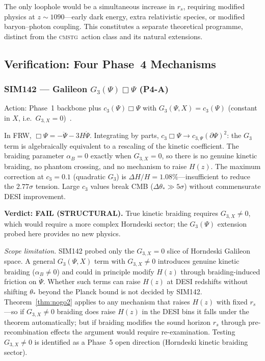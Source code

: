\documentclass[12pt,a4paper]{article}
\newcommand{\CMSTG}{\textsc{cmstg}}
\newcommand{\thetastar}{\theta_*}
\newcommand{\rs}{r_s}
\theoremstyle{plain}
\begin{document}
The only loophole would be a simultaneous increase in $\rs$, requiring
modified physics at $z\sim1090$---early dark energy, extra relativistic
species, or modified baryon--photon coupling. This constitutes a separate
theoretical programme, distinct from the \CMSTG\ action class and its
natural extensions.

\subsection{Verification: Four Phase~4 Mechanisms}
\label{sec:nogo2-sims}

\subsubsection{SIM142 --- Galileon $G_3(\Psi)\Box\Psi$ (P4-A)}

Action: Phase~1 backbone plus $c_3(\Psi)\Box\Psi$ with $G_3(\Psi,X)=c_3(\Psi)$
(constant in $X$, i.e.\ $G_{3,X}=0$)~\cite{Nicolis2009,Horndeski1974}.

In FRW, $\Box\Psi = -\ddot\Psi-3H\dot\Psi$. Integrating by parts,
$c_3\Box\Psi\to c_{3,\Psi}(\partial\Psi)^2$: the $G_3$ term is algebraically
equivalent to a rescaling of the kinetic coefficient. The braiding parameter
$\alpha_B=0$ exactly when $G_{3,X}=0$, so there is no genuine kinetic braiding,
no phantom crossing, and no mechanism to raise $H(z)$. The maximum correction
at $c_3=0.1$ (quadratic $G_3$) is $\Delta H/H=1.08\%$---insufficient to reduce
the $2.77\sigma$ tension. Large $c_3$ values break CMB ($\Delta\thetastar\gg5\sigma$)
without commensurate DESI improvement.

\textbf{Verdict: FAIL (STRUCTURAL).} True kinetic braiding requires $G_{3,X}\neq0$,
which would require a more complex Horndeski sector; the $G_3(\Psi)$ extension
probed here provides no new physics.

\textit{Scope limitation.} SIM142 probed only the $G_{3,X}=0$ slice of Horndeski
Galileon space. A general $G_3(\Psi,X)$ term with $G_{3,X}\neq0$ introduces genuine
kinetic braiding ($\alpha_B\neq0$) and could in principle modify $H(z)$ through
braiding-induced friction on $\dot\Psi$. Whether such terms can raise $H(z)$ at
DESI redshifts without shifting $\thetastar$ beyond the Planck bound is not decided
by SIM142. Theorem~\ref{thm:nogo2} applies to any mechanism that raises $H(z)$ with
fixed $\rs$---so if $G_{3,X}\neq0$ braiding does raise $H(z)$ in the DESI bins it
falls under the theorem automatically; but if braiding modifies the sound horizon
$\rs$ through pre-recombination effects the argument would require re-examination.
Testing $G_{3,X}\neq0$ is identified as a Phase~5 open direction (Horndeski kinetic
braiding sector).
\end{document}
